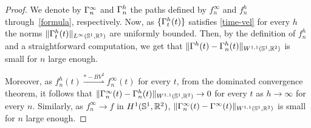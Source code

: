 \begin{proof}
We denote by $\Gamma_n^\infty$ and $\Gamma_n^h$ the paths defined by $f_n^\infty$ and $f_n^h$  through~\eqref{formula}, respectively. 
Now, as  $\{\Gamma^h_t(t)\}$  satisfies \eqref{time-vel} for every $h$ the norms  $\|\Gamma^h_t(t)\|_{L^\infty(\mathbb{S}^1,\mathbb{R}^2)}$ are uniformly bounded. Then, by the definition of $f^h_n$ and a straightforward computation, we get that 
$\| \Gamma^h(t) -\Gamma^h_n(t)\|_{W^{1,1}(\mathbb{S}^1, \mathbb{R}^2)}$
is small for $n$ large enough.  

 Moreover, as  $f^h_n(t) \overset{*-BV^2}{\rightharpoonup} f^\infty_n(t)$ for every $t$, from the dominated convergence theorem, it follows that $\| \Gamma^\infty_n(t) -\Gamma^h_n(t)\|_{{W^{1,1}(\mathbb{S}^1,\mathbb{R}^2)}}\rightarrow 0$ for every $t$ as  $h\rightarrow \infty$ for every $n$.
Similarly, as  $f^\infty_n\rightarrow f$ in $H^1(\mathbb{S}^1,\mathbb{R}^2)$, 
$\| \Gamma^\infty_n(t) -\Gamma^\infty(t)\|_{W^{1,1}(\mathbb{S}^1,\mathbb{R}^2)}$ is small for $n$ large enough.


\end{proof}
